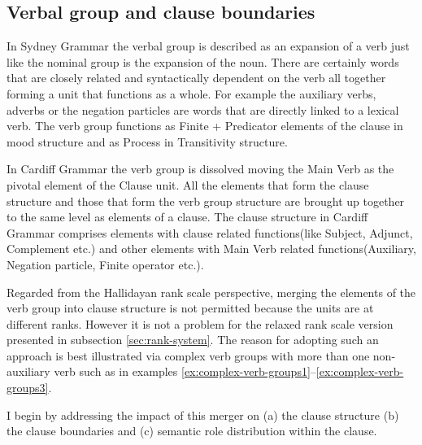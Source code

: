 
\subsection{Verbal group and clause boundaries}
\label{sec:verbal-grpoup-and-clause-division}
In Sydney Grammar the verbal group is described as an expansion of a verb just like the nominal group is the expansion of the noun\citep[396]{Halliday2013}. There are certainly words that are closely related and syntactically dependent on the verb all together forming a unit that functions as a whole. For example the auxiliary verbs, adverbs or the negation particles are words that are directly linked to a lexical verb. The verb group functions as Finite + Predicator elements of the clause in mood structure and as Process in Transitivity structure. 

In Cardiff Grammar the verb group is dissolved moving the Main Verb as the pivotal element of the Clause unit. All the elements that form the clause structure and those that form the verb group structure are brought up together to the same level as elements of a clause. The clause structure in Cardiff Grammar comprises elements with clause related functions(like Subject, Adjunct, Complement etc.) and other elements with Main Verb related functions(Auxiliary, Negation particle, Finite operator etc.).

Regarded from the Hallidayan rank scale perspective, merging the elements of the verb group into clause structure is not permitted because the units are at different ranks. However it is not a problem for the relaxed rank scale version presented in subsection \ref{sec:rank-system}. The reason for adopting such an approach is best illustrated via complex verb groups with more than one non-auxiliary verb such as in examples \ref{ex:complex-verb-groups1}--\ref{ex:complex-verb-groups3}. 

I begin by addressing the impact of this merger on (a) the clause structure (b) the clause boundaries and (c) semantic role distribution within the clause.

